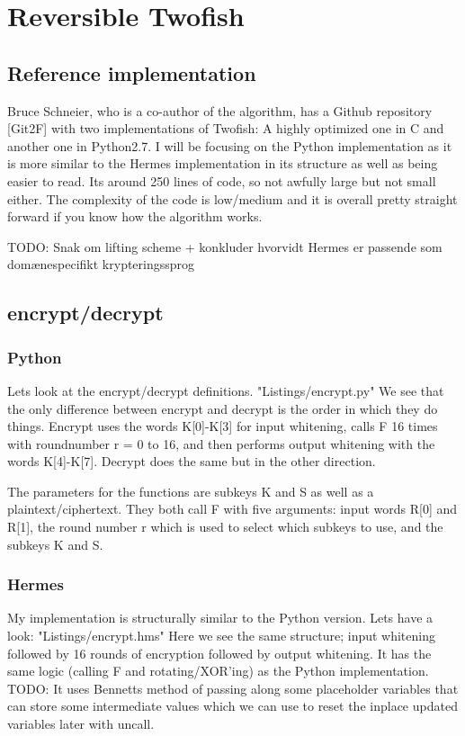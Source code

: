 \section{Reversible Twofish}
\subsection{Reference implementation}
Bruce Schneier, who is a co-author of the algorithm, has a Github repository [Git2F] with two implementations of Twofish: A highly optimized one in C and another one in Python2.7.
I will be focusing on the Python implementation as it is more similar to the Hermes implementation in its structure as well as being easier to read.
Its around 250 lines of code, so not awfully large but not small either. The complexity of the code is low/medium and it is overall pretty straight forward if you know how the algorithm works.

TODO: Snak om lifting scheme + konkluder hvorvidt Hermes er passende som domænespecifikt krypteringssprog

\subsection{encrypt/decrypt}
\subsubsection{Python}
Lets look at the encrypt/decrypt definitions.
 {"Listings/encrypt.py"}
We see that the only difference between encrypt and decrypt is the order in which they do things.
Encrypt uses the words K[0]-K[3] for input whitening, calls F 16 times with roundnumber r = 0 to 16, and then performs output whitening with the words K[4]-K[7]. Decrypt does the same but in the other direction. 

The parameters for the functions are subkeys K and S as well as a plaintext/ciphertext.
They both call F with five arguments: input words R[0] and R[1], the round number r which is used to select which subkeys to use, and the subkeys K and S.

\subsubsection{Hermes}
My implementation is structurally similar to the Python version. Lets have a look:
 {"Listings/encrypt.hms"}
Here we see the same structure; input whitening followed by 16 rounds of encryption followed by output whitening. It has the same logic (calling F and rotating/XOR'ing) as the Python implementation. TODO: It uses Bennetts method of passing along some placeholder variables that can store some intermediate values which we can use to reset the inplace updated variables later with uncall.

